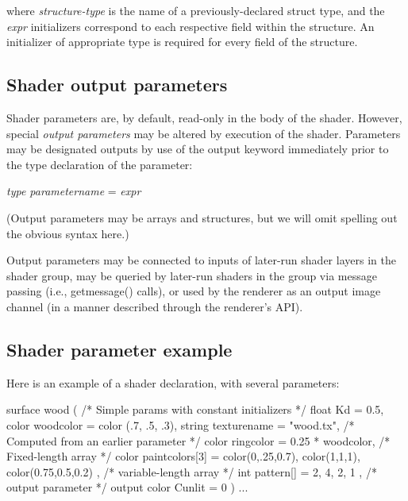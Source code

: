 \documentclass[11pt,letterpaper]{book}
\begin{document}
\noindent where \emph{structure-type} is the name of a
previously-declared {\cf struct} type, and the \emph{expr} initializers
correspond to each respective field within the structure.  An
initializer of appropriate type is required for every field of the
structure.

\subsection{Shader output parameters}
 

Shader parameters are, by default, read-only in the body of the
shader.  However, special \emph{output parameters} may be altered
by execution of the shader.  Parameters may be designated outputs
by use of the {\cf output} keyword immediately prior to the
type declaration of the parameter:

\medskip
{} \emph{type parametername} {\cf = } \emph{expr}
\medskip

\noindent (Output parameters may be arrays and structures, but we will
omit spelling out the obvious syntax here.)

Output parameters may be connected to inputs of later-run shader layers
in the shader group, may be queried by later-run shaders in the group
via message passing (i.e., {\cf getmessage()} calls), or used by the
renderer as an output image channel (in a manner described through the
renderer's API).

\subsection{Shader parameter example}

Here is an example of a shader declaration, with several parameters:

\begin{code}
    surface wood ( 
               /* Simple params with constant initializers */
                   float Kd = 0.5,
                   color woodcolor = color (.7, .5, .3),
                   string texturename = "wood.tx",
               /* Computed from an earlier parameter */
                   color ringcolor = 0.25 * woodcolor,
               /* Fixed-length array */
                   color paintcolors[3] = { color(0,.25,0.7), color(1,1,1),
                                            color(0.75,0.5,0.2) },
               /* variable-length array */
                   int pattern[] = { 2, 4, 2, 1 },
               /* output parameter */
                   output color Cunlit = 0
                 )
    {
       ...
    }
\end{code}
\end{document}
